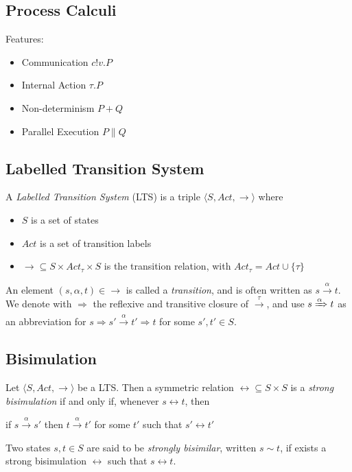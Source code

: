 \subsection{Process Calculi}

Features: \begin{itemize}
\item Communication $c!v.P$
\item Internal Action $\tau.P$
\item Non-determinism $P + Q$
\item Parallel Execution $P \parallel Q$
\end{itemize}

\subsection{Labelled Transition System}

A \textit{Labelled Transition System} (LTS) is a triple $\langle S , Act, \rightarrow \rangle$ where \begin{itemize}
\item $S$ is a set of states
\item $Act$ is a set of transition labels
\item $\rightarrow 	\subseteq S\times Act_\tau \times S$ is the transition relation, with $Act_\tau = Act \cup \{\tau\}$
\end{itemize} 

An element $(s, \alpha, t) \in \rightarrow$ is called a \textit{transition}, and is often written as $s \xrightarrow{\alpha} t$. We denote with $\Rightarrow$ the reflexive and transitive closure of $\xrightarrow{\tau}$, and use $s \xRightarrow{\alpha} t$ as an abbreviation for $s \Rightarrow s' \xrightarrow{\alpha} t' \Rightarrow t$ for some $s', t' \in S$.

\subsection{Bisimulation}

Let $\langle S , Act, \rightarrow \rangle$ be a LTS. Then a symmetric relation $\rel \subseteq S \times S$ is a \textit{strong bisimulation} if and only if, whenever $s \rel t$, then 
\begin{center}
if $s \xrightarrow{\alpha} s'$ then $t \xrightarrow{\alpha} t'$ for some $t'$ such that $s' \rel t'$
\end{center}
Two states $s, t \in S$ are said to be \textit{strongly bisimilar}, written $s \sim t$, if exists a strong bisimulation $\rel$ such that $s \rel t$.


